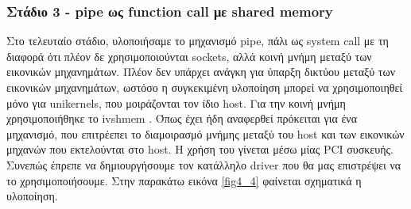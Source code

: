 
\subsubsection{Στάδιο 3 - pipe ως function call με shared memory}

Στο τελευταίο στάδιο, υλοποιήσαμε το μηχανισμό pipe, πάλι ως system call με τη
διαφορά ότι πλέον δε χρησιμοποιούνται sockets, αλλά κοινή μνήμη μεταξύ των
εικονικών μηχανημάτων. Πλέον δεν υπάρχει ανάγκη για ύπαρξη δικτύου μεταξύ των
εικονικών μηχανημάτων, ωστόσο η συγκεκιμένη υλοποίηση μπορεί να χρησιμοποιηθεί
μόνο για unikernels, που μοιράζονται τον ίδιο host. Για την κοινή μνήμη
χρησιμοποιήθηκε το ivshmem \cite{macdonell2011shared}. Όπως έχει ήδη αναφερθεί
πρόκειται για ένα μηχανισμό, που επιτρέεπει το διαμοιρασμό μνήμης μεταξύ του
host και των εικονικών μηχανών που εκτελούνται στο host. Η χρήση του γίνεται
μέσω μίας PCI συσκευής. Συνεπώς έπρεπε να δημιουργήσουμε τον κατάλληλο driver
που θα μας επιστρέψει να το χρησιμοποιήσουμε. Στην παρακάτω εικόνα \ref{fig4_4}
φαίνεται σχηματικά η υλοποίηση. 

